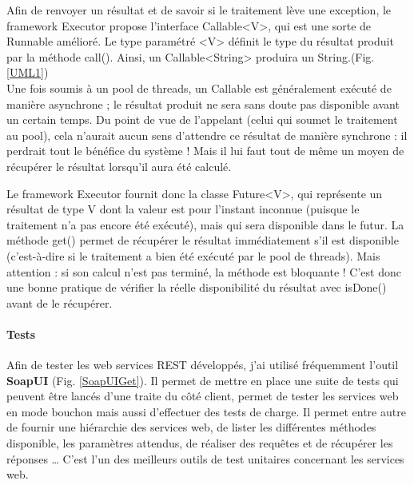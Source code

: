 \begin{itemize}
Afin de renvoyer un résultat et de savoir si le traitement lève une exception, le framework \og Executor \fg propose l'interface Callable<V>, qui est une sorte de Runnable amélioré. Le type paramétré <V> définit le type du résultat produit par la méthode call(). Ainsi, un Callable<String> produira un String.(Fig. \ref{UML1})\\

Une fois soumis à un pool de threads, un Callable est généralement exécuté de manière asynchrone ; le résultat produit ne sera sans doute pas disponible avant un certain temps.
Du point de vue de l'appelant (celui qui soumet le traitement au pool), cela n'aurait aucun sens d'attendre ce résultat de manière synchrone : il perdrait tout le bénéfice du système ! Mais il lui faut tout de même un moyen de récupérer le résultat lorsqu'il aura été calculé.

Le framework \og Executor \fg fournit donc la classe Future<V>, qui représente un résultat de type V dont la valeur est pour l'instant inconnue (puisque le traitement n'a pas encore été exécuté), mais qui sera disponible dans le futur. 
La méthode get() permet de récupérer le résultat immédiatement s'il est disponible (c'est-à-dire si le traitement a bien été exécuté par le pool de threads). Mais attention : si son calcul n'est pas terminé, la méthode est bloquante ! C'est donc une bonne pratique de vérifier la réelle disponibilité du résultat avec isDone() avant de le récupérer. \\



\paragraph{Tests}

Afin de tester les web services REST développés, j'ai utilisé fréquemment l'outil \textbf{SoapUI} (Fig. \ref{SoapUIGet}). Il permet de mettre en place une suite de tests qui peuvent être lancés d'une traite du côté client, permet de tester les services web en mode bouchon mais aussi d'effectuer des tests de charge. Il permet entre autre de fournir une hiérarchie des services web, de lister les différentes méthodes disponible, les paramètres attendus, de réaliser des requêtes et de récupérer les réponses … C'est l'un des meilleurs outils de test unitaires concernant les services web.\\


\end{itemize}
